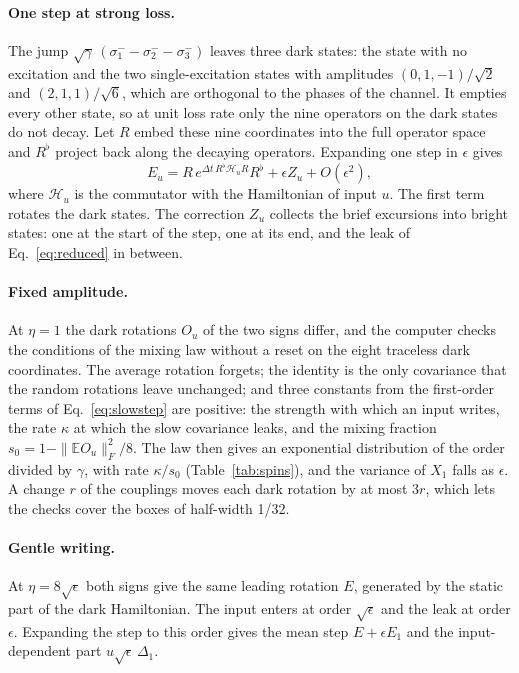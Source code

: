 \paragraph{One step at strong loss.}
The jump $\sqrt\gamma\,(\sigma_1^--\sigma_2^--\sigma_3^-)$ leaves three dark states: the state with no excitation
and the two single-excitation states with amplitudes $(0,1,-1)/\sqrt2$ and $(2,1,1)/\sqrt6$, which are orthogonal to
the phases of the channel. It empties every other state, so at unit loss rate only the nine operators on the dark
states do not decay. Let $R$ embed these nine coordinates into the full operator space and $R^\flat$ project back
along the decaying operators. Expanding one step in $\epsilon$ gives
\begin{equation}
  E_u=R\,e^{\Delta t\,R^\flat\mathcal H_uR}R^\flat+\epsilon Z_u+O(\epsilon^2),
  \label{eq:slowstep}
\end{equation}
where $\mathcal H_u$ is the commutator with the Hamiltonian of input $u$. The first term rotates the dark states. The
correction $Z_u$ collects the brief excursions into bright states: one at the start of the step, one at its end, and
the leak of Eq.~\eqref{eq:reduced} in between.

\paragraph{Fixed amplitude.}
At $\eta=1$ the dark rotations $O_u$ of the two signs differ, and the computer checks the conditions of the mixing law
without a reset on the eight traceless dark coordinates. The average rotation forgets; the identity is the only
covariance that the random rotations leave unchanged; and three constants from the first-order terms of
Eq.~\eqref{eq:slowstep} are positive: the strength with which an input writes, the rate $\kappa$ at which the slow
covariance leaks, and the mixing fraction $s_0=1-\|\mathbb EO_u\|_F^2/8$. The law then gives an exponential
distribution of the order divided by $\gamma$, with rate $\kappa/s_0$ (Table~\ref{tab:spins}), and the variance of
$X_1$ falls as $\epsilon$. A change $r$ of the couplings moves each dark rotation by at most $3r$, which lets the
checks cover the boxes of half-width 1/32.

\paragraph{Gentle writing.}
At $\eta=8\sqrt\epsilon$ both signs give the same leading rotation $E$, generated by the static part of the dark
Hamiltonian. The input enters at order $\sqrt\epsilon$ and the leak at order $\epsilon$. Expanding the step to this order
gives the mean step $E+\epsilon E_1$ and the input-dependent part $u\sqrt\epsilon\,\Delta_1$.

